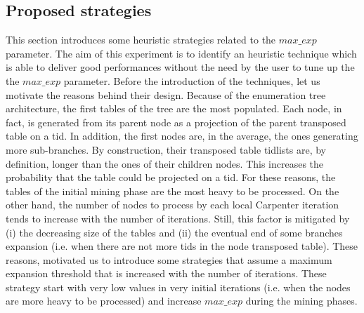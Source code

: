 \subsection{Proposed strategies}\label{exp_strategies}
This section introduces some heuristic strategies related to the $max\_exp$ parameter. 
The aim of this experiment is to identify an heuristic technique which is able to deliver good performances without the need by the user to tune up the the $max\_exp$ parameter.
Before the introduction of the techniques, let us motivate the reasons behind their design.
Because of the enumeration tree architecture, the first tables of the tree are the most populated. Each node, in fact, is generated from its parent node as a projection of the parent transposed table on a tid. 
In addition, the first nodes are, in the average, the ones generating more sub-branches. By construction, their transposed table tidlists are, by definition, longer than the ones of their children nodes. This increases the probability that the table could be projected on a tid.
For these reasons, the tables of the initial mining phase are the most heavy to be processed.
On the other hand, the number of nodes to process by each local Carpenter iteration tends to increase with the number of iterations. Still, this factor is mitigated by (i) the decreasing size of the tables and (ii) the eventual end of some branches expansion (i.e. when there are not more tids in the node transposed table).
These reasons, motivated us to introduce some strategies that assume a maximum expansion threshold that is increased with the number of iterations. These strategy start with very low values in very initial iterations  (i.e. when the nodes are more heavy to be processed) and increase $max\_exp$ during the mining phases.

